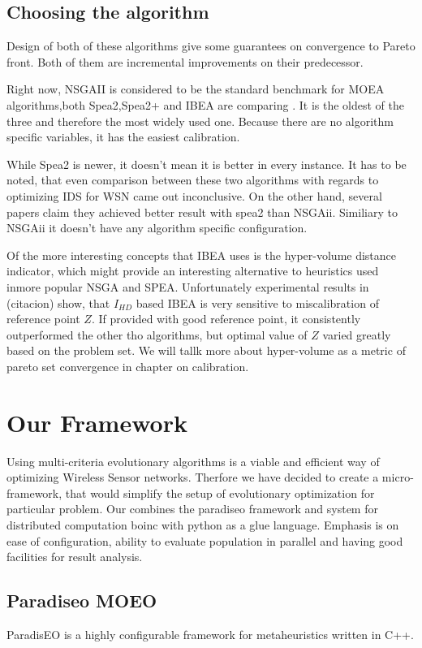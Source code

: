 \documentclass[12pt,oneside]{fithesis2}
\begin{document}
\section{Choosing the algorithm}
Design of both of these algorithms give some guarantees on convergence to Pareto front. Both of them are incremental improvements on their predecessor. 

Right now, NSGAII is considered to be the standard benchmark for MOEA algorithms,both Spea2,Spea2+ and IBEA are comparing . It is the oldest of the three and therefore the most widely used one. Because there are no algorithm specific variables, it has the easiest calibration.
       
       While Spea2 is newer, it doesn't mean it is better in every instance. It has to be noted, that even comparison between these two algorithms with regards to optimizing IDS for WSN came out inconclusive.\cite{stehl2013opt} On the other hand, several papers claim they achieved better result with spea2 than NSGAii. Similiary to NSGAii it doesn't have any algorithm specific configuration.  

Of the more interesting concepts that IBEA uses is the hyper-volume distance indicator, which might provide an interesting alternative to heuristics used inmore popular NSGA and SPEA. Unfortunately experimental results in (citacion) show, that $I_{HD}$ based IBEA is very sensitive to miscalibration of reference point $Z$. If provided with good reference point, it consistently outperformed the other tho algorithms, but optimal value of $Z$ varied greatly based on the problem set. We will tallk more about hyper-volume as a metric of pareto set convergence in chapter on calibration.


\chapter{Our Framework}

Using multi-criteria evolutionary algorithms is a viable and efficient way of optimizing Wireless Sensor networks\cite{stehl2013opt}. Therfore we have decided to create a micro-framework, that would simplify the setup of evolutionary optimization for particular problem.
Our combines the paradiseo framework and system for distributed computation boinc with python as a glue language. Emphasis is on ease of configuration, ability to evaluate population in parallel and having good facilities for result analysis.

\section{Paradiseo MOEO}
ParadisEO is a highly configurable framework for metaheuristics written in C++.\cite{liefooghe2007paradiseo} 
\end{document}
